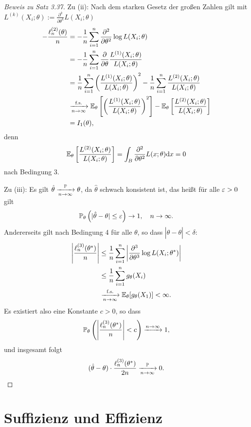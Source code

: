 \begin{proof}[Beweis zu Satz 3.37]
  Zu (ii): Nach dem starken Gesetz der großen Zahlen gilt mit
  $L^{(k)}(X_i;\theta) := \frac{\partial^k}{\partial \theta^k} L(X_i;\theta)$
  \begin{align*}
    - \frac{\ell_n^{(2)}(\theta)}{n}
    &= - \frac{1}{n} \sum_{i=1}^n \frac{\partial^2}{\partial \theta^2}
      \log L(X_i; \theta) \\
    &= - \frac{1}{n} \sum_{i=1}^n \frac{\partial}{\partial \theta}
      \frac{L^{(1)}(X_i; \theta)}{L(X_i; \theta)} \\
    &= \frac{1}{n} \sum_{i=1}^n
      \left( \frac{L^{(1)}(X_i; \theta)}{L(X_i; \theta)}  \right)^2
      - \frac{1}{n} \sum_{i=1}^n
      \frac{L^{(2)}(X_i; \theta)}{L(X_i; \theta)} \\
    &\xrightarrow[n \to \infty]{\text{f.s.}}
      \mathbb{E}_\theta \left[ \left(
      \frac{L^{(1)}(X_i; \theta)}{L(X_i; \theta)}
      \right)^2 \right]
      - \mathbb{E}_\theta \left[
      \frac{L^{(2)}(X_i; \theta)}{L(X_i; \theta)}
      \right] \\
    &= I_1(\theta),
  \end{align*}
  denn
  \[ \mathbb{E}_\theta \left[ \frac{L^{(2)}(X_i; \theta)}{L(X_i; \theta)} \right]
    = \int_B \frac{\partial^2}{\partial \theta^2} L(x;\theta) \mathrm{d} x = 0 \]
  nach Bedingung 3.

  Zu (iii): Es gilt $\hat{\theta} \xrightarrow[n \to \infty]{\mathbb{P}} \theta$, da
  $\hat{\theta}$ schwach konsistent ist, das heißt für alle $\varepsilon > 0$ gilt
  \[ \mathbb{P}_\theta \left( |\hat{\theta}-\theta| \le \varepsilon \right) \to 1, \quad
    n \to \infty. \]
  Andererseits gilt nach Bedingung 4 für alle $\theta$, so dass
  $|\hat{\theta}-\theta| < \delta$:
  \begin{align*}
    \left| \frac{\ell_n^{(3)}(\theta^*)}{n} \right|
    &\le \frac{1}{n} \sum_{i=1}^n \left| \frac{\partial^3}{\partial \theta^3}
      \log L(X_i; \theta^*) \right| \\
    &\le \frac{1}{n} \sum_{i=1}^n g_\theta(X_i) \\
    &\xrightarrow[n \to \infty]{\text{f.s.}}
      \mathbb{E}_\theta [g_\theta(X_1)] < \infty.
  \end{align*}
  Es existiert also eine Konstante $c > 0$, so dass
  \[ \mathbb{P}_\theta \left( \left|
        \frac{\ell_n^{(3)}(\theta^*)}{n}
      \right| < c \right) \xrightarrow{n \to \infty} 1, \]
  und insgesamt folgt
  \[ (\hat{\theta}-\theta) \cdot \frac{\ell_n^{(3)}(\theta^*)}{2n}
    \xrightarrow[n \to \infty]{\mathbb{P}} 0. \qedhere \]
\end{proof}

\section{Suffizienz und Effizienz}
